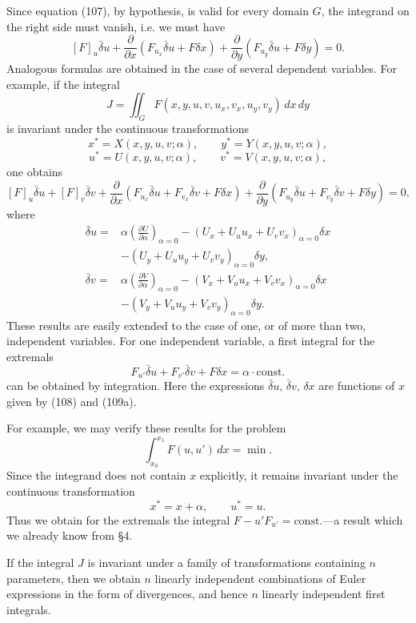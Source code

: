 Since equation (107), by hypothesis, is valid for every domain $G$, the integrand on the right side must vanish, i.e. we must have
\[
[F]_u\bar\delta u
+\frac{\partial}{\partial x}(F_{u_x}\bar\delta u+F\delta x)
+\frac{\partial}{\partial y}(F_{u_y}\bar\delta u+F\delta y)=0.
\]
Analogous formulas are obtained in the case of several dependent variables. For example, if the integral
\[
J=\iint_G F(x,y,u,v,u_x,v_x,u_y,v_y)\,dx\,dy
\]
is invariant under the continuous transformations
\[
x^*=X(x,y,u,v;\alpha),\qquad y^*=Y(x,y,u,v;\alpha),
\]
\[
u^*=U(x,y,u,v;\alpha),\qquad v^*=V(x,y,u,v;\alpha),
\]
one obtains
\[
[F]_u\bar\delta u+[F]_v\bar\delta v
+\frac{\partial}{\partial x}\left(F_{u_x}\bar\delta u+F_{v_x}\bar\delta v+F\delta x\right)
+\frac{\partial}{\partial y}\left(F_{u_y}\bar\delta u+F_{v_y}\bar\delta v+F\delta y\right)=0,
\]
where
\begin{equation}\tag{109a}
\begin{aligned}
\bar\delta u={}&\alpha\left(\frac{\partial U}{\partial\alpha}\right)_{\alpha=0}
-(U_x+U_uu_x+U_vv_x)_{\alpha=0}\delta x\\
&-(U_y+U_uu_y+U_vv_y)_{\alpha=0}\delta y,\\
\bar\delta v={}&\alpha\left(\frac{\partial V}{\partial\alpha}\right)_{\alpha=0}
-(V_x+V_uu_x+V_vv_x)_{\alpha=0}\delta x\\
&-(V_y+V_uu_y+V_vv_y)_{\alpha=0}\delta y.
\end{aligned}
\end{equation}
These results are easily extended to the case of one, or of more than two, independent variables. For one independent variable, a first integral for the extremals
\[
F_{u'}\bar\delta u+F_{v'}\bar\delta v+F\delta x=\alpha\cdot\text{const.}
\]
can be obtained by integration. Here the expressions $\bar\delta u$, $\bar\delta v$, $\delta x$ are functions of $x$ given by (108) and (109a).

For example, we may verify these results for the problem
\[
\int_{x_0}^{x_1}F(u,u')\,dx=\min.
\]
Since the integrand does not contain $x$ explicitly, it remains invariant under the continuous transformation
\[
x^*=x+\alpha,\qquad u^*=u.
\]
Thus we obtain for the extremals the integral $F-u'F_{u'}=\text{const.}$---a result which we already know from \S4.

If the integral $J$ is invariant under a family of transformations containing $n$ parameters, then we obtain $n$ linearly independent combinations of Euler expressions in the form of divergences, and hence $n$ linearly independent first integrals.


